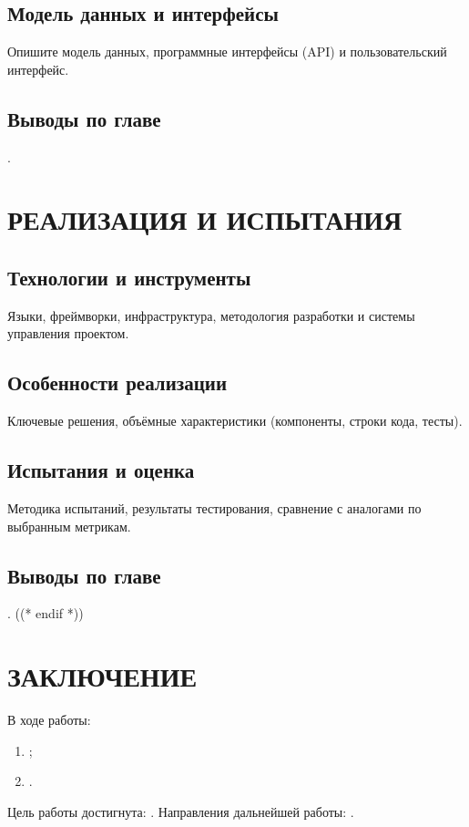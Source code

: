\documentclass[12pt,a4paper]{extreport}
\begin{document}
\section{Модель данных и интерфейсы}
Опишите модель данных, программные интерфейсы (API) и пользовательский интерфейс.

\section{Выводы по главе}
.

\clearpage
\chapter{РЕАЛИЗАЦИЯ И ИСПЫТАНИЯ}
\section{Технологии и инструменты}
Языки, фреймворки, инфраструктура, методология разработки и системы
управления проектом.

\section{Особенности реализации}
Ключевые решения, объёмные характеристики (компоненты, строки кода, тесты).

\section{Испытания и оценка}
Методика испытаний, результаты тестирования, сравнение с аналогами по
выбранным метрикам.

\section{Выводы по главе}
.
((* endif *))

\clearpage
\chapter*{ЗАКЛЮЧЕНИЕ}
В ходе работы:
\begin{enumerate}[label=\arabic*), leftmargin=1.25cm]
  \item {};
  \item {}.
\end{enumerate}
Цель работы достигнута: .
Направления дальнейшей работы: .
\end{document}

